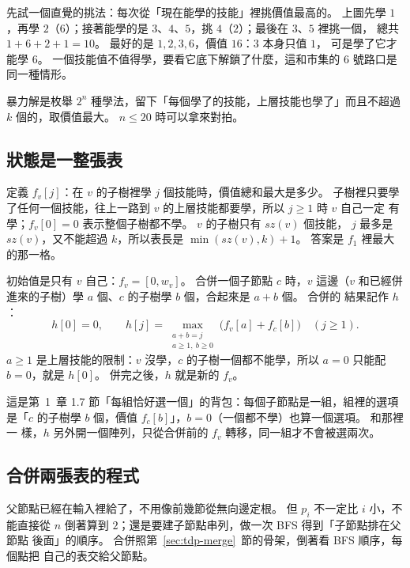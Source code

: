 先試一個直覺的挑法：每次從「現在能學的技能」裡挑價值最高的。 上圖先學 $1$，再學
$2$（$6$）；接著能學的是 $3$、$4$、$5$，挑 $4$（$2$）；最後在 $3$、$5$ 裡挑一個，
總共 $1 + 6 + 2 + 1 = 10$。 最好的是 $1, 2, 3, 6$，價值 $16$：$3$ 本身只值 $1$，
可是學了它才能學 $6$。 一個技能值不值得學，要看它底下解鎖了什麼，這和市集的 $6$
號路口是同一種情形。

暴力解是枚舉 $2^n$ 種學法，留下「每個學了的技能，上層技能也學了」而且不超過 $k$
個的，取價值最大。 $n \le 20$ 時可以拿來對拍。

\subsection{狀態是一整張表}

定義 $f_v[j]$：在 $v$ 的子樹裡學 $j$ 個技能時，價值總和最大是多少。 子樹裡只要學
了任何一個技能，往上一路到 $v$ 的上層技能都要學，所以 $j \ge 1$ 時 $v$ 自己一定
有學；$f_v[0] = 0$ 表示整個子樹都不學。 $v$ 的子樹只有 $\mathit{sz}(v)$ 個技能，
$j$ 最多是 $\mathit{sz}(v)$，又不能超過 $k$，所以表長是 $\min(\mathit{sz}(v), k) +
1$。 答案是 $f_1$ 裡最大的那一格。

初始值是只有 $v$ 自己：$f_v = [0, w_v]$。 合併一個子節點 $c$ 時，$v$ 這邊（$v$
和已經併進來的子樹）學 $a$ 個、$c$ 的子樹學 $b$ 個，合起來是 $a + b$ 個。 合併的
結果記作 $h$：
\[
h[0] = 0,\qquad
h[j] = \max_{\substack{a + b = j\\ a \ge 1,\ b \ge 0}} \bigl(f_v[a] + f_c[b]\bigr)
\quad (j \ge 1).
\]
$a \ge 1$ 是上層技能的限制：$v$ 沒學，$c$ 的子樹一個都不能學，所以 $a = 0$ 只能配
$b = 0$，就是 $h[0]$。 併完之後，$h$ 就是新的 $f_v$。

這是第~1~章 1.7 節「每組恰好選一個」的背包：每個子節點是一組，組裡的選項是「$c$
的子樹學 $b$ 個，價值 $f_c[b]$」，$b = 0$（一個都不學）也算一個選項。 和那裡一
樣，$h$ 另外開一個陣列，只從合併前的 $f_v$ 轉移，同一組才不會被選兩次。

\subsection{合併兩張表的程式}

父節點已經在輸入裡給了，不用像前幾節從無向邊定根。 但 $p_i$ 不一定比 $i$ 小，不
能直接從 $n$ 倒著算到 $2$；還是要建子節點串列，做一次 BFS 得到「子節點排在父節點
後面」的順序。 合併照第~\ref{sec:tdp-merge}~節的骨架，倒著看 BFS 順序，每個點把
自己的表交給父節點。

